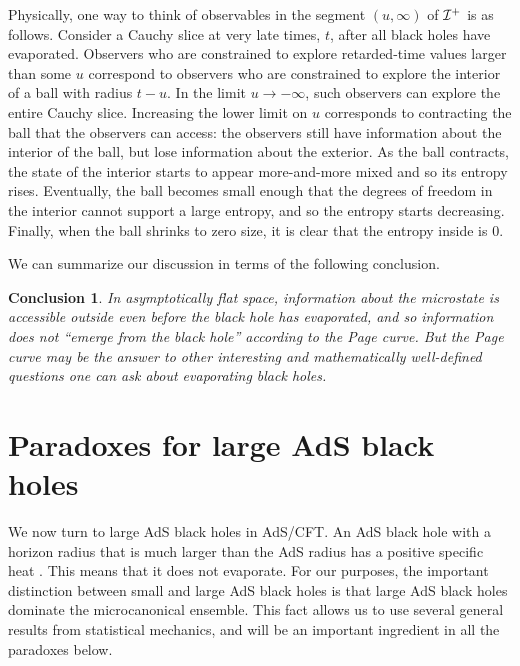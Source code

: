 \documentclass[12pt]{article}
\def \scrip{{\cal I}^{+}}
\newtheorem{lesson}{Conclusion}
\begin{document}
Physically, one way to think of observables in the segment $(u, \infty)$ of  $\scrip$ is as follows.  Consider a Cauchy slice at very late times, $t$, after all black holes have evaporated. Observers who are constrained to explore retarded-time values larger than some $u$ correspond to observers who are constrained to explore the interior of a ball with radius $t - u$. In the limit $u \rightarrow -\infty$, such observers can explore the entire Cauchy slice. Increasing the lower limit on $u$ corresponds to contracting the ball that the observers can access: the observers still have information about the interior of the ball, but lose information about the exterior. As the ball contracts, the state of the interior starts to appear more-and-more mixed and so its entropy rises.  Eventually, the ball becomes small enough that the degrees of freedom in the interior cannot support a large entropy, and so the entropy starts decreasing. Finally, when the ball shrinks to zero size, it is clear that the entropy inside is 0.









































We can summarize our discussion in terms of the following conclusion.
\begin{lesson}
In asymptotically flat space, information about the microstate is accessible outside even before the black hole has evaporated, and so information does not ``emerge from the black hole'' according to the Page curve.
 But the Page curve may be the answer to other interesting and mathematically well-defined questions one can ask about evaporating black holes.
\end{lesson}

\section{Paradoxes for large AdS black holes \label{seclargeads}}
We now turn to large AdS black holes in AdS/CFT. An AdS black hole with a horizon radius that is much larger than the AdS radius has a positive specific heat \cite{Hawking:1982dh}. This means that it does not evaporate. For our purposes, the important distinction between small and large AdS black holes is that large AdS black holes dominate the microcanonical ensemble. This fact allows us to use several general
results from statistical mechanics, and will be an important ingredient in all the paradoxes below.
\end{document}
